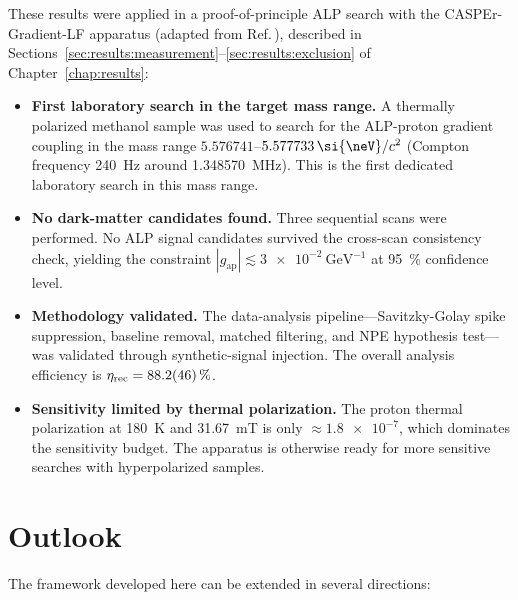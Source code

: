 These results were applied in a proof-of-principle ALP search with the CASPEr-Gradient-LF apparatus (adapted from Ref.\,\cite{Walter2024_LFthermal}), described in Sections~\ref{sec:results:measurement}--\ref{sec:results:exclusion} of Chapter~\ref{chap:results}:

\begin{itemize}
    \item \textbf{First laboratory search in the target mass range.} A thermally polarized methanol sample was used to search for the ALP-proton gradient coupling in the mass range $5.576741$--$5.577733\,\si{\neV}/c^2$ (Compton frequency \SI{240}{\Hz} around \SI{1.348570}{\MHz}). This is the first dedicated laboratory search in this mass range.

    \item \textbf{No dark-matter candidates found.} Three sequential scans were performed. No ALP signal candidates survived the cross-scan consistency check, yielding the constraint $|g_\mathrm{ap}| \lesssim \SI{3e-2}{\GeV^{-1}}$ at \SI{95}{\%} confidence level.

    \item \textbf{Methodology validated.} The data-analysis pipeline---Savitzky-Golay spike suppression, baseline removal, matched filtering, and NPE hypothesis test---was validated through synthetic-signal injection. The overall analysis efficiency is $\eta_\mathrm{rec} = \SI{88.2\pm4.6}{\%}$.

    \item \textbf{Sensitivity limited by thermal polarization.} The proton thermal polarization at \SI{180}{\kelvin} and \SI{31.67}{\milli\tesla} is only $\approx\num{1.8e-7}$, which dominates the sensitivity budget. The apparatus is otherwise ready for more sensitive searches with hyperpolarized samples.
\end{itemize}


\section{Outlook}

The framework developed here can be extended in several directions:

